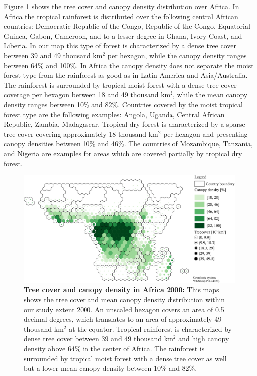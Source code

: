 			Figure \ref{fig:africa_tree_cover} shows the tree cover and canopy density distribution over Africa. In Africa the tropical rainforest is distributed over the following central African countries: Democratic Republic of the Congo, Republic of the Congo, Equatorial Guinea, Gabon, Cameroon, and to a lesser degree in Ghana, Ivory Coast, and Liberia. In our map this type of forest is characterized by a dense tree cover between 39 and 49 thousand km$^2$ per hexagon, while the canopy density ranges between 64\% and 100\%. In Africa the canopy density does not separate the moist forest type from the rainforest as good as in Latin America and Asia/Australia. The rainforest is surrounded by tropical moist forest with a dense tree cover coverage per hexagon between 18 and 49 thousand km$^2$, while the mean canopy density ranges between 10\% and 82\%. Countries covered by the moist tropical forest type are the following examples: Angola, Uganda, Central African Republic, Zambia, Madagascar. Tropical dry forest is characterized by a sparse tree cover covering approximately 18 thousand km$^2$ per hexagon and presenting canopy densities between 10\% and 46\%. The countries of Mozambique, Tanzania, and Nigeria are examples for areas which are covered partially by tropical dry forest.
			\begin{figure}[ht]
				\centering
				\includegraphics[scale=1.]{img/africa_treecover_frameless}
				\caption[Tree cover and canopy density in Africa 2000]{\textbf{Tree cover and canopy density in Africa 2000:} This maps shows the tree cover and mean canopy density distribution within our study extent 2000. An unscaled hexagon covers an area of 0.5 decimal degrees, which translates to an area of approximately 49 thousand km$^2$ at the equator. Tropical rainforest is characterized by dense tree cover between 39 and 49 thousand km$^2$ and high canopy density above 64\% in the center of Africa. The rainforest is surrounded by tropical moist forest with a dense tree cover as well but a lower mean canopy density between 10\% and 82\%.}
				\label{fig:africa_tree_cover}
			\end{figure}

